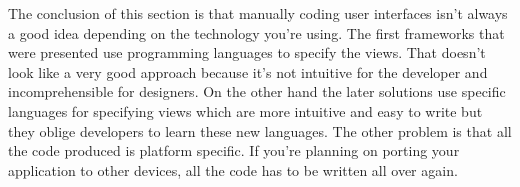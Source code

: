 The conclusion of this section is that manually coding user interfaces isn't always a good idea depending on the technology you're using. The first frameworks that were presented use programming languages to specify the views. That doesn't look like a very good approach because it's not intuitive for the developer and incomprehensible for designers. On the other hand the later solutions use specific languages for specifying views which are more intuitive and easy to write but they oblige developers to learn these new languages. The other problem is that all the code produced is platform specific. If you're planning on porting your application to other devices, all the code has to be written all over again.
